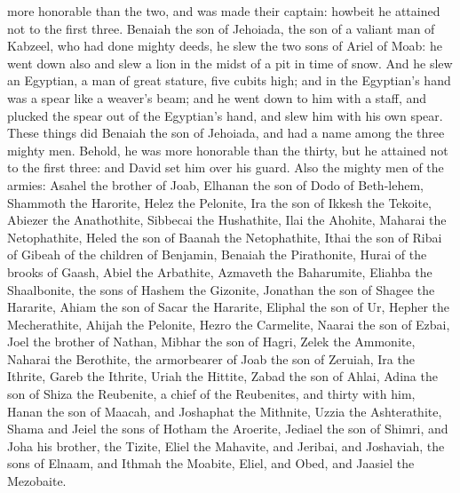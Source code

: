 more honorable than the two, and was made their captain: howbeit he attained not to the first three.  Benaiah the son of Jehoiada, the son of a valiant man of Kabzeel, who had done mighty deeds, he slew the two sons of Ariel of Moab: he went down also and slew a lion in the midst of a pit in time of snow. And he slew an Egyptian, a man of great stature, five cubits high; and in the Egyptian’s hand was a spear like a weaver’s beam; and he went down to him with a staff, and plucked the spear out of the Egyptian’s hand, and slew him with his own spear. These things did Benaiah the son of Jehoiada, and had a name among the three mighty men. Behold, he was more honorable than the thirty, but he attained not to the first three: and David set him over his guard.  Also the mighty men of the armies: Asahel the brother of Joab, Elhanan the son of Dodo of Beth-lehem, Shammoth the Harorite, Helez the Pelonite, Ira the son of Ikkesh the Tekoite, Abiezer the Anathothite, Sibbecai the Hushathite, Ilai the Ahohite, Maharai the Netophathite, Heled the son of Baanah the Netophathite, Ithai the son of Ribai of Gibeah of the children of Benjamin, Benaiah the Pirathonite, Hurai of the brooks of Gaash, Abiel the Arbathite, Azmaveth the Baharumite, Eliahba the Shaalbonite, the sons of Hashem the Gizonite, Jonathan the son of Shagee the Hararite, Ahiam the son of Sacar the Hararite, Eliphal the son of Ur, Hepher the Mecherathite, Ahijah the Pelonite, Hezro the Carmelite, Naarai the son of Ezbai, Joel the brother of Nathan, Mibhar the son of Hagri, Zelek the Ammonite, Naharai the Berothite, the armorbearer of Joab the son of Zeruiah, Ira the Ithrite, Gareb the Ithrite, Uriah the Hittite, Zabad the son of Ahlai, Adina the son of Shiza the Reubenite, a chief of the Reubenites, and thirty with him, Hanan the son of Maacah, and Joshaphat the Mithnite, Uzzia the Ashterathite, Shama and Jeiel the sons of Hotham the Aroerite, Jediael the son of Shimri, and Joha his brother, the Tizite, Eliel the Mahavite, and Jeribai, and Joshaviah, the sons of Elnaam, and Ithmah the Moabite, Eliel, and Obed, and Jaasiel the Mezobaite. 

